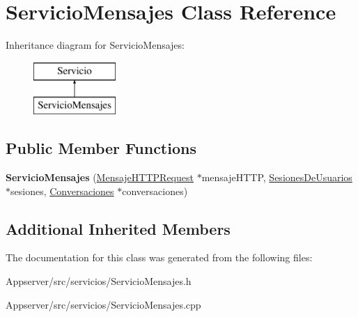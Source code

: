 \hypertarget{classServicioMensajes}{}\section{Servicio\+Mensajes Class Reference}
\label{classServicioMensajes}
Inheritance diagram for Servicio\+Mensajes\+:\begin{figure}[H]
\begin{center}
\leavevmode
\includegraphics[height=2.000000cm]{classServicioMensajes}
\end{center}
\end{figure}
\subsection*{Public Member Functions}
\begin{DoxyCompactItemize}
\item 
{\bfseries Servicio\+Mensajes} (\hyperlink{classMensajeHTTPRequest}{Mensaje\+H\+T\+T\+P\+Request} $\ast$mensaje\+H\+T\+TP, \hyperlink{classSesionesDeUsuarios}{Sesiones\+De\+Usuarios} $\ast$sesiones, \hyperlink{classConversaciones}{Conversaciones} $\ast$conversaciones)\hypertarget{classServicioMensajes_acd9d4f5a54048bc0a95ca84e93ff1c28}{}\label{classServicioMensajes_acd9d4f5a54048bc0a95ca84e93ff1c28}

\end{DoxyCompactItemize}
\subsection*{Additional Inherited Members}


The documentation for this class was generated from the following files\+:\begin{DoxyCompactItemize}
\item 
Appserver/src/servicios/Servicio\+Mensajes.\+h\item 
Appserver/src/servicios/Servicio\+Mensajes.\+cpp\end{DoxyCompactItemize}
